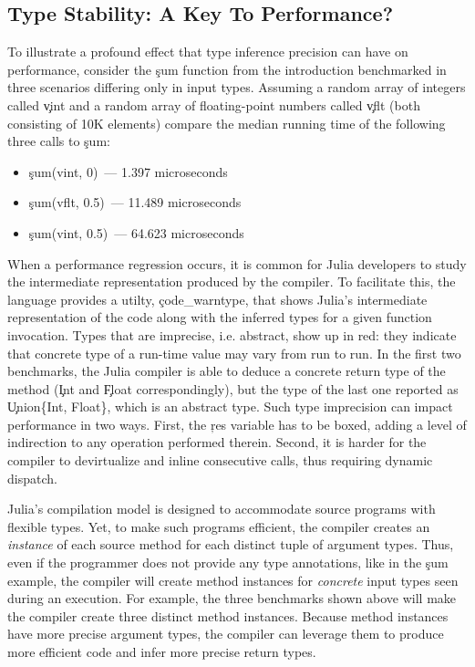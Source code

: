 \documentclass[sigplan,screen]{acmart}
\begin{document}
\subsection{Type Stability: A Key To Performance?}

To illustrate a profound effect that type inference precision can have on
performance, consider the \c{sum} function from the introduction benchmarked in
three scenarios differing only in input types. Assuming a random array of integers
called \c{vint} and a random array of floating-point numbers called \c{vflt}
(both consisting of 10K elements)
compare the median running time of the following three calls to \c{sum}:
\begin{itemize}

  \item \c{sum(vint, 0)}~--- 1.397 microseconds
  \item \c{sum(vflt, 0.5)}~--- 11.489 microseconds
  \item \c{sum(vint, 0.5)}~--- 64.623 microseconds
\end{itemize}

When a performance regression occurs, it is common for Julia developers to study
the intermediate representation produced by the compiler. To facilitate this,
the language provides a utilty, \c{code_warntype}, that shows Julia's
intermediate representation of the code along with the inferred types for a given function
invocation. Types that are imprecise, i.e. abstract, show up in red: they
indicate that concrete type of a run-time value may vary from run to run.
%
In the first two benchmarks, the Julia compiler is able to deduce a concrete return
type of the method (\c{Int} and \c{Float} correspondingly), but the type of the last one
reported as \c{Union\{Int, Float\}}, which is an abstract type.
%
Such type imprecision can impact performance in two ways. First,
the \c{res} variable has to be boxed, adding a level of indirection to
any operation performed therein. Second, it is harder for
the compiler to devirtualize and inline consecutive calls, thus requiring
dynamic dispatch.

Julia's compilation model is designed to accommodate source programs
with flexible types. Yet, to make such programs efficient, the compiler
creates an \emph{instance} of each source method for each distinct tuple of
argument types. Thus, even if the programmer does not provide any type
annotations, like in the \c{sum} example, the compiler will create method
instances for \emph{concrete} input types seen during
an execution. For example, the three benchmarks shown above will make the
compiler create three distinct method instances.
Because method instances have more precise argument types, the compiler can
leverage them to produce more efficient code and infer more precise return types.
\end{document}
